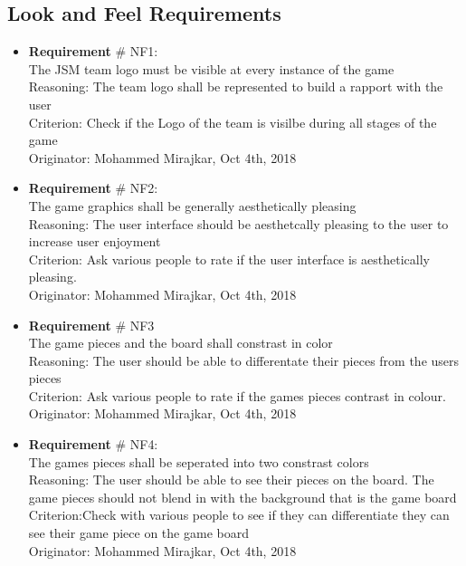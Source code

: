 \documentclass[12pt, titlepage]{article}
\renewcommand{\bf}{\textbf}
\begin{document}
\subsection{Look and Feel Requirements}
\begin{itemize}
	\item  {\color {blue}\bf{ Requirement}} \# NF1:\\
	      The JSM team logo must be visible at every instance of the game\\
	      Reasoning: The team logo shall be represented to build a rapport with the user\\
	      Criterion: Check if the Logo of the team is visilbe during all stages of the game\\
	      Originator: Mohammed Mirajkar, Oct 4th, 2018
	\item {\color {blue}\bf{ Requirement}} \# NF2:\\
	      The game graphics shall be generally aesthetically pleasing\\
	      Reasoning: The user interface should be aesthetcally pleasing to the user to increase user enjoyment\\
	      Criterion: Ask various people to rate if the user interface is aesthetically pleasing.\\
	      Originator: Mohammed Mirajkar, Oct 4th, 2018
	\item  {\color {blue}\bf{ Requirement}} \# NF3\\
	      The game pieces and the board shall constrast in color\\
	      Reasoning: The user should be able to differentate their pieces from the users pieces\\
	      Criterion: Ask various people to rate if the games pieces contrast in colour.\\
	      Originator: Mohammed Mirajkar, Oct 4th, 2018
	\item {\color {blue}\bf{ Requirement}} \# NF{\color {blue}4:}\\
	      The games pieces shall be seperated into two constrast colors\\
	      Reasoning: The user should be able to see their pieces on the board. The game pieces should not blend in with the background that is the game board\\
	      Criterion:Check with various people to see if they can differentiate they can see their game piece on the game board\\
	      Originator: Mohammed Mirajkar, Oct 4th, 2018

\end{itemize}
\end{document}
